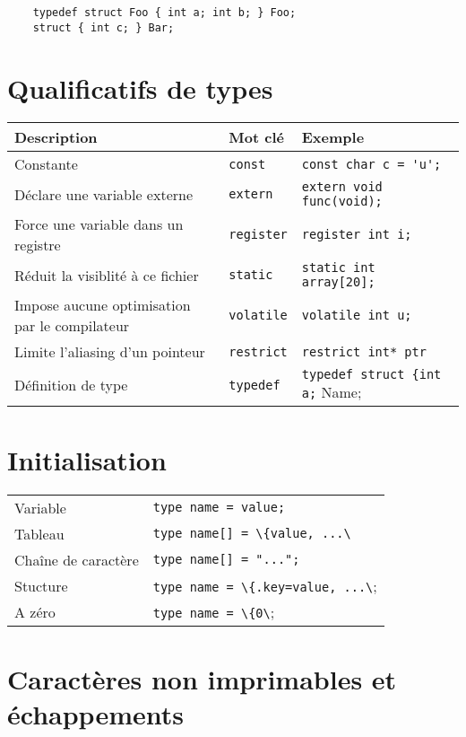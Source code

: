\documentclass{article}
\newcommand{\cd}{\lstinline}
\begin{document}
\begin{multicols*}{3}
  \begin{lstlisting}
    typedef struct Foo { int a; int b; } Foo;
    struct { int c; } Bar;
  \end{lstlisting}


\section*{Qualificatifs de types}

\begin{tabularx}{\linewidth}{X|l|l}
  \bf Description                     & \bf Mot clé & \bf Exemple \\
  \hline
  Constante                           & \cd{const}    & \cd{const char c = 'u';}\\
  Déclare une variable externe        & \cd{extern}   & \cd{extern void func(void);}\\
  Force une variable dans un registre & \cd{register} & \cd{register int i;}\\
  Réduit la visiblité à ce fichier    & \cd{static}   & \cd{static int array[20];}\\
  Impose aucune optimisation par le compilateur & \cd{volatile} & \cd{volatile int u;}\\
  Limite l'aliasing d'un pointeur     & \cd{restrict} & \cd{restrict int* ptr}\\
  Définition de type                  & \cd{typedef} & \cd{typedef struct {int a;} Name;}\\
\end{tabularx}

\section*{Initialisation}
\begin{tabularx}{\linewidth}{Xl}
  Variable & \cd{type name = value;} \\
  Tableau & \cd{type name[] = \{value, ...\}}; \\
  Chaîne de caractère & \cd{type name[] = "...";} \\
  Stucture & \cd{type name = \{.key=value, ...\};} \\
  A zéro & \cd{type name = \{0\};} \\
\end{tabularx}

\section*{Caractères non imprimables et échappements}
\begin{tabularx}{\linewidth}{
  >{\hsize=0.3\hsize}X%
  >{\hsize=1.7\hsize}X%
  >{\hsize=0.3\hsize}X%
  >{\hsize=1.7\hsize}X%
  }


\end{tabularx}
\end{multicols*}
\end{document}
